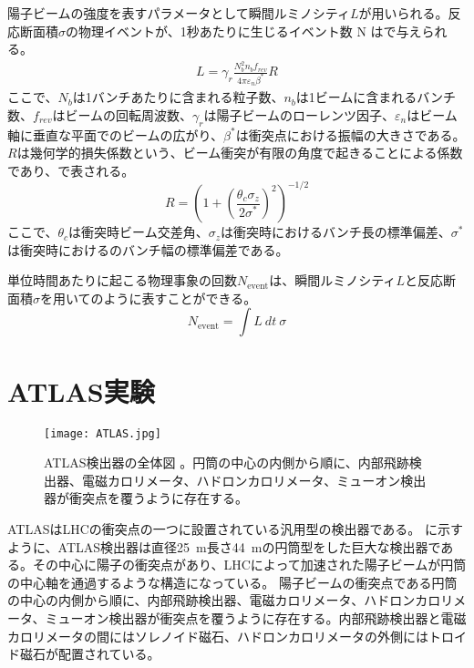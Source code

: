 陽子ビームの強度を表すパラメータとして瞬間ルミノシティ$L$が用いられる。反応断面積$\sigma$の物理イベントが、1秒あたりに生じるイベント数 N はで与えられる。
\begin{align}
  \label{eq:lumi}
  L = \gamma_{r} \frac{N_{b}^{2} n_{b} f_{rev}}{4\pi \varepsilon_{n} \beta^*}R
\end{align}
ここで、$N_{b}$は1バンチあたりに含まれる粒子数、$n_{b}$は1ビームに含まれるバンチ数、$f_{rev}$はビームの回転周波数、$\gamma_{r}$は陽子ビームのローレンツ因子、$\varepsilon_{n}$はビーム軸に垂直な平面でのビームの広がり、$\beta^{*}$は衝突点における振幅の大きさである。$R$は幾何学的損失係数という、ビーム衝突が有限の角度で起きることによる係数であり、で表される。
\begin{equation}
  \label{eq:kikaf}
  R=\left( 1+\left( \frac{\theta_{c}\sigma_{z}}{2\sigma^{*}} \right)^2 \right)^{-1/2}
\end{equation}
ここで、$\theta_c$は衝突時ビーム交差角、$\sigma_z$は衝突時におけるバンチ長の標準偏差、$\sigma^*$は衝突時におけるのバンチ幅の標準偏差である。

単位時間あたりに起こる物理事象の回数$N_\mathrm{event}$は、瞬間ルミノシティ$L$と反応断面積$\sigma$を用いてのように表すことができる。
\begin{equation}
  \label{eq:hannnou}
  N_\mathrm{event} = \int L\ dt\ \sigma
\end{equation}




\section{ATLAS実験}
\label{sec:ATLAS}
\begin{figure}[tbp]
  \centering
  \texttt{[image: ATLAS.jpg]}
  \caption[ATLAS検出器]{ATLAS検出器の全体図 \cite{ATLAS}。円筒の中心の内側から順に、内部飛跡検出器、電磁カロリメータ、ハドロンカロリメータ、ミューオン検出器が衝突点を覆うように存在する。}
  \label{fig:ATLAS}
\end{figure}


ATLASはLHCの衝突点の一つに設置されている汎用型の検出器である。 に示すように、ATLAS検出器は直径25\ \si{m}長さ44\ \si{m}の円筒型をした巨大な検出器である。その中心に陽子の衝突点があり、LHCによって加速された陽子ビームが円筒の中心軸を通過するような構造になっている。
陽子ビームの衝突点である円筒の中心の内側から順に、内部飛跡検出器、電磁カロリメータ、ハドロンカロリメータ、ミューオン検出器が衝突点を覆うように存在する。内部飛跡検出器と電磁カロリメータの間にはソレノイド磁石、ハドロンカロリメータの外側にはトロイド磁石が配置されている。



